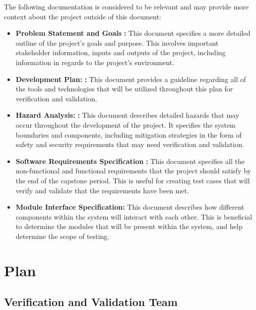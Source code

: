\documentclass[12pt, titlepage]{article}
\begin{document}
The following documentation is considered to be relevant and may provide more context about the project outside of this document:
\begin{itemize}
  \item \textbf{Problem Statement and Goals} \citep{ProblemStatementGoals}\textbf{:} This document specifies a more detailed outline of the project's goals and purpose. This involves important stakeholder information, inputs and outputs of the project, including information in regards to the project's environment.
  \item \textbf{Development Plan:} \citep{DevelopmentPlan}\textbf{:} This document provides a guideline regarding all of the tools and technologies that will be utilized throughout this plan for verification and validation.
  \item \textbf{Hazard Analysis:} \citep{HazardAnalysis}\textbf{:} This document describes detailed hazards that may occur throughout the development of the project. It specifies the system boundaries and components, including mitigation strategies in the form of safety and security requirements that may need verification and validation.
  \item \textbf{Software Requirements Specification} \citep{SRS}\textbf{:} This document specifies all the non-functional and functional requirements that the project should satisfy by the end of the capstone period. This is useful for creating test cases that will verify and validate that the requirements have been met.
  \item \textbf{Module Interface Specification:} This document describes how different components within the system will interact with each other. This is beneficial to determine the modules that will be present within the system, and help determine the scope of testing.

\end{itemize}

\section{Plan}


\subsection{Verification and Validation Team}
\end{document}

